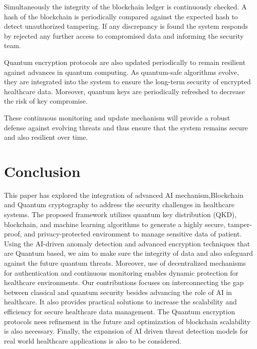 \documentclass[pdflatex,sn-mathphys-num]{sn-jnl}
\theoremstyle{thmstyleone}%
\theoremstyle{thmstyletwo}%
\theoremstyle{thmstylethree}%
\begin{document}
Simultaneously the integrity of the blockchain ledger is continuously checked. A hash of the blockchain is periodically compared against the expected hash to detect unauthorized tampering. If any discrepancy is found the system responds by rejected any further access to compromised data and informing the security team\cite{bib16}.

Quantum encryption protocols are also updated periodically to remain resilient against advances in quantum computing. As quantum-safe algorithms evolve, they are integrated into the system to ensure the long-term security of encrypted healthcare data. Moreover, quantum keys are periodically refreshed to decrease the risk of key compromise.

These continuous monitoring and update mechanism will provide a robust defense against evolving threats and thus ensure that the system remains secure and also resilient over time.










\section{Conclusion}
This paper has explored the integration of advanced AI mechanism,Blockchain and Quantum cryptography to address the security challenges in healthcare systems. The proposed framework utilizes quantum key distribution (QKD), blockchain, and machine learning algorithms to generate a highly secure, tamper-proof, and privacy-protected environment to manage sensitive data of patient. Using the AI-driven anomaly detection and advanced encryption techniques that are Quantum based, we aim to make sure the integrity of data and also safeguard against the future quantum threats. Moreover, use of decentralized mechanisms for authentication and continuous monitoring enables dynamic protection for healthcare environments. Our contributions focuses on interconnecting the gap between classical and quantum security besides advancing the role of AI in healthcare. It also provides practical solutions to increase the scalability and efficiency for secure healthcare data management. The Quantum encryption protocols nees refinement in the future and optimization of blockchain scalability is also necessary. Finally, the expansion of AI driven threat detection models for real world healthcare applications is also to be considered.










\end{document}
